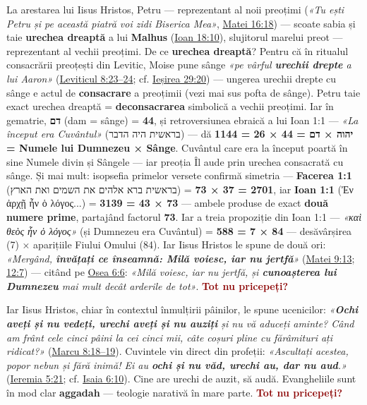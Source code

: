 \documentclass[12pt,a4paper,twoside,openany]{book}
\begin{document}
La arestarea lui Iisus Hristos, Petru — reprezentant al noii preoțimi (\textit{«Tu ești Petru și pe această piatră voi zidi Biserica Mea»}, \href{https://bibliaortodoxa.ro/carte.php?id=55\&cap=16\#18}{Matei 16:18}) — scoate sabia și taie \textbf{urechea dreaptă} a lui \textbf{Malhus} (\href{https://bibliaortodoxa.ro/carte.php?id=35\&cap=18\#10}{Ioan 18:10}), slujitorul marelui preot — reprezentant al vechii preoțimi. De ce \textbf{urechea dreaptă}? Pentru că în ritualul consacrării preoțești din Levitic, Moise pune sânge \textit{«pe vârful \textbf{urechii drepte} a lui Aaron»} (\href{https://bibliaortodoxa.ro/carte.php?id=47\&cap=8\#23}{Leviticul 8:23–24}; cf. \href{https://bibliaortodoxa.ro/carte.php?id=32\&cap=29\#20}{Ieșirea 29:20}) — ungerea urechii drepte cu sânge e actul de \textbf{consacrare} a preoțimii (vezi mai sus pofta de sânge). Petru taie exact urechea dreaptă = \textbf{deconsacrarea} simbolică a vechii preoțimi. Iar în gematrie, \textbf{דם} (dam = sânge) = \textbf{44}, și retroversiunea ebraică a lui Ioan 1:1 — \textit{«La început era Cuvântul»} (בראשית היה הדבר) — dă \textbf{1144 = 26 × 44 = יהוה × דם = Numele lui Dumnezeu × Sânge}. Cuvântul care era la început poartă în sine Numele divin și Sângele — iar preoția Îl aude prin urechea consacrată cu sânge. Și mai mult: isopsefia primelor versete confirmă simetria — \textbf{Facerea 1:1} (בראשית ברא אלהים את השמים ואת הארץ) = \textbf{2701 = 37 × 73}, iar \textbf{Ioan 1:1} (Ἐν ἀρχῇ ἦν ὁ λόγος...) = \textbf{3139 = 43 × 73} — ambele produse de exact \textbf{două numere prime}, partajând factorul \textbf{73}. Iar a treia propoziție din Ioan 1:1 — \textit{«καὶ θεὸς ἦν ὁ λόγος»} (și Dumnezeu era Cuvântul) = \textbf{588 = 7 × 84} — desăvârșirea (7) × aparițiile Fiului Omului (84). Iar Iisus Hristos le spune de două ori: \textit{«Mergând, \textbf{învățați ce înseamnă: Milă voiesc, iar nu jertfă}»} (\href{https://bibliaortodoxa.ro/carte.php?id=55\&cap=9\#13}{Matei 9:13}; \href{https://bibliaortodoxa.ro/carte.php?id=55\&cap=12\#7}{12:7}) — citând pe \href{https://bibliaortodoxa.ro/carte.php?id=60\&cap=6\#6}{Osea 6:6}: \textit{«Milă voiesc, iar nu jertfă, și \textbf{cunoașterea lui Dumnezeu} mai mult decât arderile de tot»}. \textcolor{darkred}{\textbf{Tot nu pricepeți?}}

Iar Iisus Hristos, chiar în contextul înmulțirii pâinilor, le spune ucenicilor: \textit{«\textbf{Ochi aveți și nu vedeți, urechi aveți și nu auziți} și nu vă aduceți aminte? Când am frânt cele cinci pâini la cei cinci mii, câte coșuri pline cu fărâmituri ați ridicat?»} (\href{https://bibliaortodoxa.ro/carte.php?id=53\&cap=8\#18}{Marcu 8:18–19}). Cuvintele vin direct din profeții: \textit{«Ascultați acestea, popor nebun și fără inimă! Ei au \textbf{ochi și nu văd, urechi au, dar nu aud}.»} (\href{https://bibliaortodoxa.ro/carte.php?id=31\&cap=5\#21}{Ieremia 5:21}; cf. \href{https://bibliaortodoxa.ro/carte.php?id=43\&cap=6\#10}{Isaia 6:10}). Cine are urechi de auzit, să audă. Evangheliile sunt în mod clar \textbf{aggadah} — teologie narativă în mare parte. \textcolor{darkred}{\textbf{Tot nu pricepeți?}}
\end{document}
